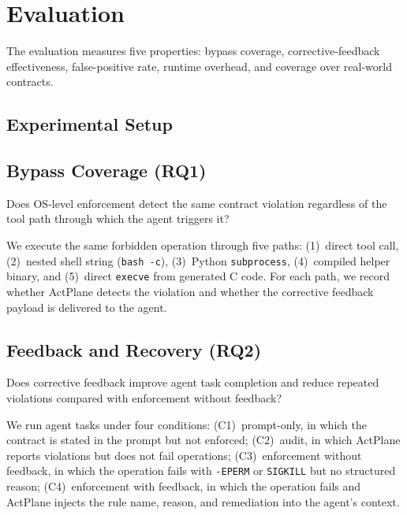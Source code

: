 \section{Evaluation}
\label{sec:evaluation}

The evaluation measures five properties: bypass coverage, corrective-feedback
effectiveness, false-positive rate, runtime overhead, and coverage over
real-world contracts.

\subsection{Experimental Setup}


\subsection{Bypass Coverage (RQ1)}

Does OS-level enforcement detect the same contract violation regardless of
the tool path through which the agent triggers it?

We execute the same forbidden operation through five paths: (1)~direct tool
call, (2)~nested shell string (\texttt{bash~-c}), (3)~Python
\texttt{subprocess}, (4)~compiled helper binary, and (5)~direct
\texttt{execve} from generated C code. For each path, we record whether
ActPlane detects the violation and whether the corrective feedback payload
is delivered to the agent.


\subsection{Feedback and Recovery (RQ2)}

Does corrective feedback improve agent task completion and reduce repeated
violations compared with enforcement without feedback?

We run agent tasks under four conditions: (C1)~prompt-only, in which the
contract is stated in the prompt but not enforced; (C2)~audit, in which ActPlane
reports violations but does not fail operations; (C3)~enforcement without
feedback, in which the operation fails with \texttt{-EPERM} or \texttt{SIGKILL}
but no structured reason; (C4)~enforcement with feedback, in which the operation
fails and ActPlane injects the rule name, reason, and remediation into the
agent's context.

